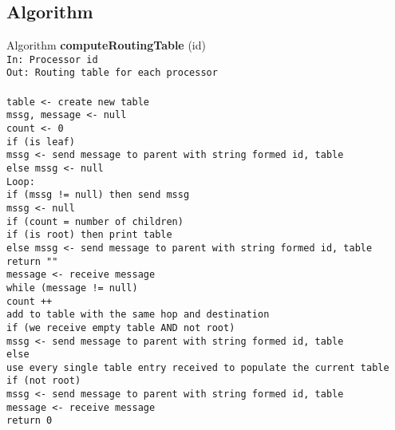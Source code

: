 \documentclass[12pt,letterpaper]{article}
\begin{document}
\subsection* {Algorithm}
Algorithm \textbf{computeRoutingTable} (id)\\
\texttt {In: Processor id\\
\texttt Out: Routing table for each processor\\ \\
\texttt table <- create new table \\
\texttt mssg, message <- null \\
\texttt count <- 0 \\
\texttt if (is leaf) \\
\hphantom{~~~~} mssg <- send message to parent with string formed id, table \\
\texttt else mssg <- null \\
\texttt Loop: \\
\texttt if (mssg != null) then send mssg \\
\texttt mssg <- null \\
\texttt if (count = number of children) \\
\hphantom{~~~~} if (is root) then print table \\
\hphantom{~~~~} else mssg <- send message to parent with string formed id, table \\
\hphantom{~~~~} return "" \\
\texttt message <- receive message \\
\texttt while (message != null) \\
\hphantom{~~~~} count ++ \\
\hphantom{~~~~} add to table with the same hop and destination \\
\hphantom{~~~~} if (we receive empty table AND not root) \\
\hphantom{~~~~~~~~}mssg <- send message to parent with string formed id, table \\
\hphantom{~~~~} else \\
\hphantom{~~~~~~~~} use every single table entry received to populate the current table \\
\hphantom{~~~~~~~~} if (not root) \\
\hphantom{~~~~~~~~~~~~} mssg <- send message to parent with string formed id, table \\
\hphantom{~~~~} message <- receive message \\
\texttt return 0} \\
\end{document}
